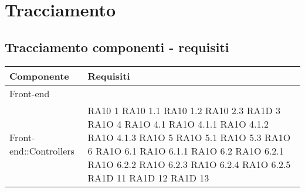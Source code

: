 \section{Tracciamento}


\subsection{Tracciamento componenti - requisiti}
 

      \begin{center}
      \bgroup
      \def\arraystretch{1.8}
      \begin{longtable}{|p{5cm}|p{3cm}|}
    
      \cellcolor[gray]{0.9} \textbf{Componente} & \cellcolor[gray]{0.9} \textbf{Requisiti}  \\ \hline
      
	Front-end & \\ \hline

		Front-end::Controllers & RA10 1 \newline RA10 1.1 \newline RA10 1.2 \newline RA10 2.3 \newline RA1D 3 \newline	RA1O 4 \newline	RA1O 4.1 \newline
		RA1O 4.1.1 \newline RA1O 4.1.2 \newline  RA1O 4.1.3 \newline	RA1O 5 \newline RA1O 5.1 \newline RA1O 5.3 \newline RA1O 6 \newline
		RA1O 6.1 \newline RA1O 6.1.1 \newline RA1O 6.2 \newline RA1O 6.2.1 \newline RA1O 6.2.2 \newline RA1O 6.2.3 \newline RA1O 6.2.4 \newline RA1O 6.2.5
		RA1D 11 \newline  RA1D 12 \newline RA1D 13 \newline
		\\ \hline
	

\end{longtable}
\end{center}
